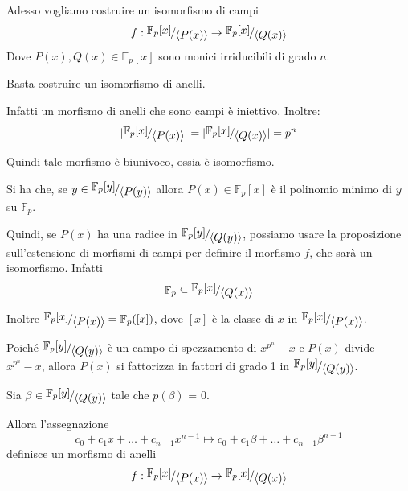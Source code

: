 \documentclass[../main.tex]{subfiles}
\begin{document}
Adesso vogliamo costruire un isomorfismo di campi
\begin{equation*}
    f: \nicefrac{\mathbb{F}_p[x]}{\langle P(x)\rangle} \rightarrow \nicefrac{\mathbb{F}_p[x]}{\langle Q(x)\rangle}
\end{equation*}
Dove $P(x), Q(x) \in \mathbb{F}_p[x]$ sono monici irriducibili di grado $n$.

Basta costruire un isomorfismo di anelli.

Infatti un morfismo di anelli che sono campi è iniettivo. Inoltre:
\begin{equation*}
    |\nicefrac{\mathbb{F}_p[x]}{\langle P(x)\rangle}| = |\nicefrac{\mathbb{F}_p[x]}{\langle Q(x)\rangle}| = p^n
\end{equation*}

Quindi tale morfismo è biunivoco, ossia è isomorfismo.

Si ha che, se $y \in \nicefrac{\mathbb{F}_p[y]}{\langle P(y)\rangle}$ allora $P(x) \in \mathbb{F}_p[x]$ è il polinomio minimo di $y$ su $\mathbb{F}_p$.

Quindi, se $P(x)$ ha una radice in $\nicefrac{\mathbb{F}_p[y]}{\langle Q(y)\rangle}$, possiamo usare la proposizione sull'estensione di morfismi di campi per definire il morfismo $f$, che sarà un isomorfismo. Infatti
\[
    \mathbb{F}_p \subseteq \nicefrac{\mathbb{F}_p[x]}{\langle Q(x)\rangle}
\]

Inoltre $\nicefrac{\mathbb{F}_p[x]}{\langle P(x)\rangle} = \mathbb{F}_p([x])$, dove $[x]$ è la classe di $x$ in $\nicefrac{\mathbb{F}_p[x]}{\langle P(x)\rangle}$.

Poiché $\nicefrac{\mathbb{F}_p[y]}{\langle Q(y)\rangle}$ è un campo di spezzamento di $x^{p^n} - x$ e $P(x)$ divide $x^{p^n} - x$, allora $P(x)$ si fattorizza in fattori di grado 1 in $\nicefrac{\mathbb{F}_p[y]}{\langle Q(y)\rangle}$.

Sia $\beta \in \nicefrac{\mathbb{F}_p[y]}{\langle Q(y)\rangle}$ tale che $p(\beta)$ = 0.

Allora l'assegnazione
\begin{equation*}
    c_0 + c_1 x + \ldots + c_{n-1} x^{n-1} \mapsto c_0 + c_1 \beta + \ldots + c_{n-1} \beta^{n-1}
\end{equation*}
definisce un morfismo di anelli
\begin{equation*}
    f: \nicefrac{\mathbb{F}_p[x]}{\langle P(x)\rangle} \rightarrow \nicefrac{\mathbb{F}_p[x]}{\langle Q(x)\rangle}
\end{equation*}
\end{document}
